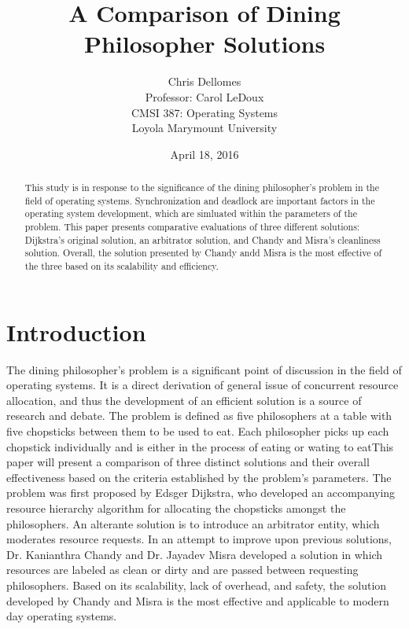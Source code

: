 \documentclass{article}
\begin{document}
\title{A Comparison of Dining Philosopher Solutions}
\author{Chris Dellomes\\
Professor: Carol LeDoux\\
CMSI 387: Operating Systems\\
	Loyola Marymount University}

\date{April 18, 2016}

\maketitle

\begin{center}
\begin{abstract}
This study is in response to the significance of the dining philosopher's problem in the field of operating systems. Synchronization and deadlock are important factors in the operating system development, which are simluated within the parameters of the problem. This paper presents comparative evaluations of three different solutions: Dijkstra's original solution, an arbitrator solution, and Chandy and Misra's cleanliness solution. Overall, the solution presented by Chandy andd Misra is the most effective of the three based on its scalability and efficiency.
\end{abstract}
\end{center}

\thispagestyle{empty}

\clearpage

\setcounter{page}{1}

\section{Introduction} The dining philosopher's problem is a significant point of discussion in the field of operating systems. It is a direct derivation of general issue of concurrent resource allocation, and thus the development of an efficient solution is a source of research and debate. The problem is defined as five philosophers at a table with five chopsticks between them to be used to eat. Each philosopher picks up each chopstick individually and is either in the process of eating or wating to eatThis paper will present a comparison of three distinct solutions and their overall effectiveness based on the criteria established by the problem's parameters. The problem was first proposed by Edsger Dijkstra, who developed an accompanying resource hierarchy algorithm for allocating the chopsticks amongst the philosophers. An alterante solution is to introduce an arbitrator entity, which moderates resource requests. In an attempt to improve upon previous solutions, Dr. Kanianthra Chandy and Dr. Jayadev Misra developed a solution in which resources are labeled as clean or dirty and are passed between requesting philosophers. Based on its scalability, lack of overhead, and safety, the solution developed by Chandy and Misra is the most effective and applicable to modern day operating systems.
\end{document}
